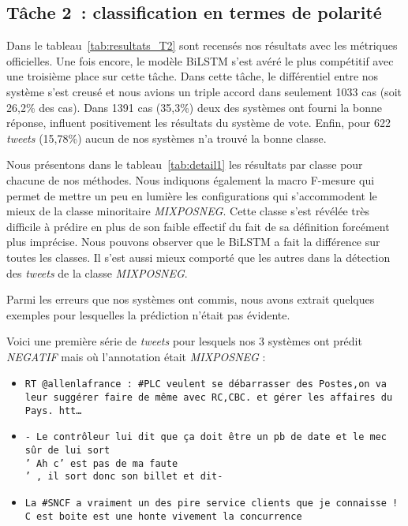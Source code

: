 \subsection{Tâche 2~: classification en termes de polarité}


Dans le tableau~\ref{tab:resultats_T2} sont recensés nos résultats avec les métriques officielles.
Une fois encore, le modèle BiLSTM s'est avéré le plus compétitif avec une troisième place sur cette tâche.
Dans cette tâche, le différentiel entre nos système s'est creusé et nous avions un triple accord dans seulement 1033 cas (soit 26,2\% des cas). Dans 1391 cas (35,3\%) deux des systèmes ont fourni la bonne réponse, influent positivement les résultats du système de vote.
 Enfin, pour 622 \textit{tweets} (15,78\%) aucun de nos systèmes n'a trouvé la bonne classe.



Nous présentons dans le tableau~\ref{tab:detail1} les résultats par classe pour chacune de nos méthodes.
Nous indiquons également la macro F-mesure qui permet de mettre un peu en lumière les configurations qui s'accommodent le mieux de la classe minoritaire \emph{MIXPOSNEG}.
Cette classe s'est révélée très difficile à prédire en plus de son faible effectif du fait de sa définition forcément plus imprécise.
Nous pouvons observer que le BiLSTM a fait la différence sur toutes les classes.
Il s'est aussi mieux comporté que les autres dans la détection des \textit{tweets} de la classe \emph{MIXPOSNEG}.



 Parmi les erreurs que nos systèmes ont commis, nous avons extrait quelques exemples pour lesquelles la prédiction n'était pas évidente.

Voici une première série de \textit{tweets} pour lesquels nos 3 systèmes ont prédit \emph{NEGATIF} mais où l'annotation était \emph{MIXPOSNEG} :
\begin{itemize}
\item \texttt{RT @allenlafrance : \#PLC veulent se débarrasser des Postes,on va leur suggérer faire de même avec RC,CBC. et gérer les affaires du Pays. htt\dots}
\item \texttt{- Le contrôleur lui dit que ça doit être un pb de date et le mec sûr de lui sort\\' Ah c' est pas de ma faute\\' , il sort donc son billet et dit-}
\item \texttt{La \#SNCF a vraiment un des pire service clients que je connaisse ! C est boite est une honte vivement la concurrence}
\end{itemize}

